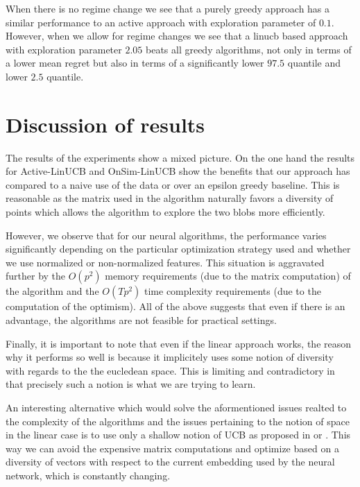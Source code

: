 \documentclass{article}
\begin{document}
When there is no regime change we see that a purely greedy approach has a similar performance to an active approach with exploration parameter
of $0.1$.
However, when we allow for regime changes we see that a linucb based approach with exploration parameter $2.05$ beats all greedy algorithms,
not only in terms of a lower mean regret but also in terms of a significantly lower $97.5$ quantile and lower $2.5$ quantile.

\section{Discussion of results}
The results of the experiments show a mixed picture.
On the one hand the results for Active-LinUCB and OnSim-LinUCB show the benefits that our approach has
compared to a naive use of the data or over an epsilon greedy baseline.
This is reasonable as the matrix used in the algorithm naturally favors a diversity of points which allows
the algorithm to explore the two blobs more efficiently.

However, we observe that for our neural algorithms, the performance varies significantly depending on the particular optimization
strategy used and whether we use normalized or non-normalized features.
This situation is aggravated further by the $O(p^2)$ memory requirements (due to the matrix computation) of the algorithm and the $O(Tp^2)$ time complexity requirements (due to the computation of the optimism).
All of the above suggests that even if there is an advantage, the algorithms are not feasible for practical settings.

Finally, it is important to note that even if the linear approach works, the reason why it performs so well is because it implicitely uses
some notion of diversity with regards to the the eucledean space.
This is limiting and contradictory in that precisely such a notion is what we are trying to learn.

An interesting alternative which would solve the aformentioned issues realted to the complexity of the algorithms and
the issues pertaining to the notion of space in the linear case is to use only a shallow notion of UCB as proposed in \cite{shallow} or
\cite{deep-bayesian-bandits-show-down}.
This way we can avoid the expensive matrix computations and optimize based on a diversity of vectors with respect to the current embedding
used by the neural network, which is constantly changing.
\end{document}
